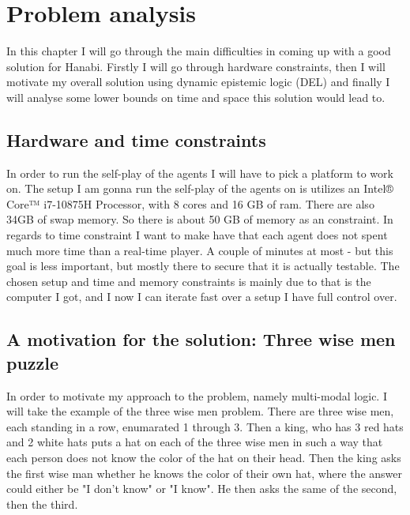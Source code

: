 \section{Problem analysis}

In this chapter I will go through the main difficulties in coming up with a good solution for Hanabi. Firstly I will go through hardware constraints, then I will motivate my overall solution using dynamic epistemic logic (DEL) and finally I will analyse some lower bounds on time and space this solution would lead to.

\subsection{Hardware and time constraints}
In order to run the self-play of the agents I will have to pick a platform to work on.
The setup I am gonna run the self-play of the agents on is utilizes an Intel® Core™ i7-10875H Processor, with 8 cores and 16 GB of ram. There are also 34GB of swap memory. So there is about 50 GB of memory as an constraint.
In regards to time constraint I want to make have that each agent does not spent much more time than a real-time player. A couple of minutes at most - but this goal is less important, but mostly there to secure that it is actually testable.
The chosen setup and time and memory constraints is mainly due to that is the computer I got, and I now I can iterate fast over a setup I have full control over.


\subsection{A motivation for the solution: Three wise men puzzle}\label{sec:motivation}
In order to motivate my approach to the problem, namely multi-modal logic. 
I will take the example of the three wise men problem.
There are three wise men, each standing in a row, enumarated 1 through 3. 
Then a king, who has 3 red hats and 2 white hats puts a hat on each of the three wise men in such a way that each person does not know the color of the hat on their head. 
Then the king asks the first wise man whether he knows the color of their own hat, where the answer could either be "I don't know" or "I know". 
He then asks the same of the second, then the third.

